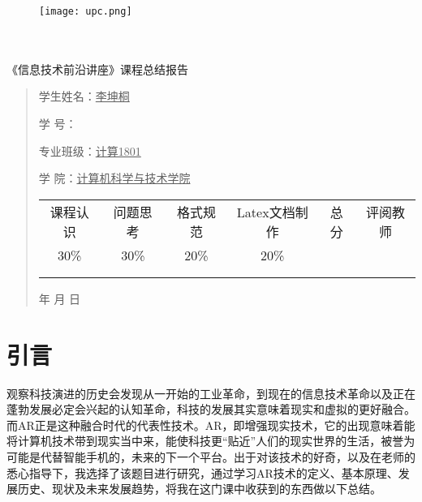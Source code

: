 \documentclass{article}
\renewcommand{\today}{\number\year 年 \number\month 月 \number\day 日}
\begin{document}
\begin{figure}
    \centering
    \texttt{[image: upc.png]}

    \label{figupc}
\end{figure}

	\begin{center}
		\quad \\
		\quad \\
		\heiti \fontsize{45}{17} \quad \quad \quad 
		\vskip 1.5cm
		\heiti {} 《信息技术前沿讲座》课程总结报告
	\end{center}
	\vskip 2.0cm
		
	\begin{quotation}
		\doublespacing
		
        \par\setlength\parindent{7em}
		\quad 

		学生姓名：\underline{\qquad  李坤桐 \qquad \qquad}

		学\hspace{0.61cm} 号：\underline{\qquad}
		
		专业班级：\underline{\qquad 计算1801 \qquad  }
		
        学\hspace{0.61cm} 院：\underline{计算机科学与技术学院}
		\vskip 2cm
		\centering
		\begin{table}[h]
            \centering 
            \begin{tabular}{|c|c|c|c|c|c|}
                \hline
                课程认识 & 问题思 考 & 格式规范  & Latex文档制作   & 总分 & 评阅教师 \\
                30\% & 30\% & 20\% & 20\%  &  &  \\
                \hline
                 & & & &  &\\
                & & & &  &\\
                \hline
            \end{tabular}
        \end{table}
		\vskip 2cm
		\today
	\end{quotation}

\thispagestyle{empty}
\newpage
\setcounter{page}{1}
\section{引言}
观察科技演进的历史会发现从一开始的工业革命，到现在的信息技术革命以及正在蓬勃发展必定会兴起的认知革命，科技的发展其实意味着现实和虚拟的更好融合。而AR正是这种融合时代的代表性技术。AR，即增强现实技术，它的出现意味着能将计算机技术带到现实当中来，能使科技更“贴近”人们的现实世界的生活，被誉为可能是代替智能手机的，未来的下一个平台。出于对该技术的好奇，以及在老师的悉心指导下，我选择了该题目进行研究，通过学习AR技术的定义、基本原理、发展历史、现状及未来发展趋势，将我在这门课中收获到的东西做以下总结。
\end{document}
